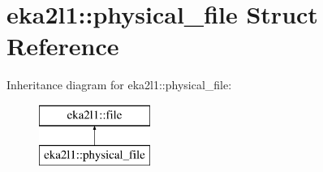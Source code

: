 \hypertarget{structeka2l1_1_1physical__file}{}\section{eka2l1\+:\+:physical\+\_\+file Struct Reference}
\label{structeka2l1_1_1physical__file}
Inheritance diagram for eka2l1\+:\+:physical\+\_\+file\+:\begin{figure}[H]
\begin{center}
\leavevmode
\includegraphics[height=2.000000cm]{structeka2l1_1_1physical__file}
\end{center}
\end{figure}
